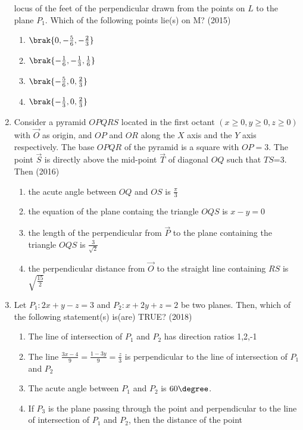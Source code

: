 \begin{enumerate}[label=\thesubsection.\arabic*.,ref=\thesubsection.\theenumi]
		locus of the feet of the perpendicular drawn from the points on $L$ to the plane $P_1$. Which of the following points lie(s) on M? \hfill{(2015)}
\begin{multicols}{2}
		\begin{enumerate}
			\item $\brak{0,-\frac{5}{6},-\frac{2}{3}}$
			\item $\brak{-\frac{1}{6},-\frac{1}{3},\frac{1}{6}}$
			\item $\brak{-\frac{5}{6},0,\frac{2}{3}}$
			\item $\brak{-\frac{1}{3},0,\frac{2}{3}}$
		\end{enumerate}
\end{multicols}
	\item Consider a pyramid $OPQRS$ located in the first octant $(x\geq 0,y\geq 0,z\geq 0)$ with $\vec{O}$ as origin, and $OP$ and $OR$ along the $X$ axis and the $Y$ axis respectively. The base $OPQR$ of the pyramid is
		a square with $OP=3$. The point $\vec{S}$ is directly above the mid-point $\vec{T}$ of diagonal $OQ$ such that $TS$=3. Then \hfill{(2016)}
		\begin{enumerate}
			\item the acute angle between $OQ$ and $OS$ is $\frac{\pi}{3}$
			\item the equation of the plane containg the triangle $OQS$ is $x-y=0$
			\item the length of the perpendicular from $\vec{P}$ to the plane containing the triangle $OQS$ is $\frac{3}{\sqrt{2}}$
			\item the perpendicular distance from $\vec{O}$ to the straight line containing $RS$ is $\sqrt{\frac{15}{2}}$
		\end{enumerate}
	\item Let $P_1:2x+y-z=3$ and $P_2:x+2y+z=2$ be two planes. Then, which of the following statement(s) is(are) TRUE? \hfill{(2018)}
		\begin{enumerate}
			\item The line of intersection of $P_1$ and $P_2$ has direction ratios 1,2,-1
			\item The line $\frac{3x-4}{9}=\frac{1-3y}{9}=\frac{z}{3}$ is perpendicular to the line of intersection of $P_1$ and $P_2$
			\item The acute angle between $P_1$ and $P_2$ is $60\degree$.
			\item If $P_3$ is the plane passing through the point  and perpendicular to the line of intersection of $P_1$ and $P_2$, then the distance of the point 

\end{enumerate}
\end{enumerate}

